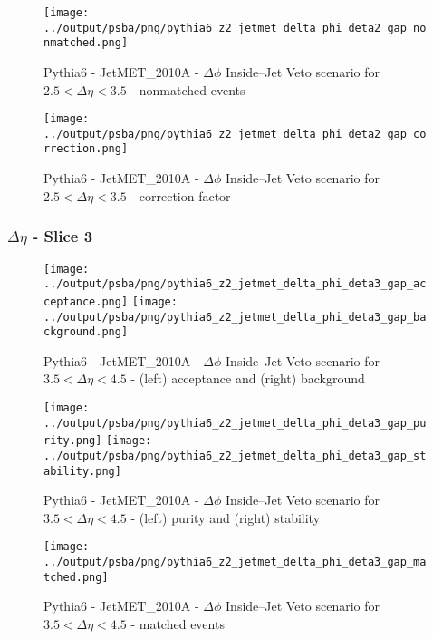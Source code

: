 \documentclass[11pt]{book}
\begin{document}
\begin{figure}[ht]
\centering
\texttt{[image: ../output/psba/png/pythia6\_z2\_jetmet\_delta\_phi\_deta2\_gap\_nonmatched.png]}
\caption{Pythia6 - JetMET\_2010A - $\Delta\phi$ Inside--Jet Veto scenario for $2.5 < \Delta\eta < 3.5$ - nonmatched events}
\label{fig:p6_jetmet_delta_phi_deta2_gap_nonmatched}
\end{figure}

\begin{figure}[ht]
\centering
\texttt{[image: ../output/psba/png/pythia6\_z2\_jetmet\_delta\_phi\_deta2\_gap\_correction.png]}
\caption{Pythia6 - JetMET\_2010A - $\Delta\phi$ Inside--Jet Veto scenario for $2.5 < \Delta\eta < 3.5$ - correction factor}
\label{fig:p6_jetmet_delta_phi_deta2_gap_correction}
\end{figure}


\clearpage
\subsubsection{$\Delta\eta$ - Slice 3}
\begin{figure}[ht]
\centering
\texttt{[image: ../output/psba/png/pythia6\_z2\_jetmet\_delta\_phi\_deta3\_gap\_acceptance.png]}
\texttt{[image: ../output/psba/png/pythia6\_z2\_jetmet\_delta\_phi\_deta3\_gap\_background.png]}
\caption{Pythia6 - JetMET\_2010A - $\Delta\phi$ Inside--Jet Veto scenario for $3.5 < \Delta\eta < 4.5$ - (left) acceptance and (right) background}
\label{fig:p6_jetmet_delta_phi_deta3_gap_ab}
\end{figure}

\begin{figure}[ht]
\centering
\texttt{[image: ../output/psba/png/pythia6\_z2\_jetmet\_delta\_phi\_deta3\_gap\_purity.png]}
\texttt{[image: ../output/psba/png/pythia6\_z2\_jetmet\_delta\_phi\_deta3\_gap\_stability.png]}
\caption{Pythia6 - JetMET\_2010A - $\Delta\phi$ Inside--Jet Veto scenario for $3.5 < \Delta\eta < 4.5$ - (left) purity and (right) stability}
\label{fig:p6_jetmet_delta_phi_deta3_gap_ps}
\end{figure}

\begin{figure}[ht]
\centering
\texttt{[image: ../output/psba/png/pythia6\_z2\_jetmet\_delta\_phi\_deta3\_gap\_matched.png]}
\caption{Pythia6 - JetMET\_2010A - $\Delta\phi$ Inside--Jet Veto scenario for $3.5 < \Delta\eta < 4.5$ - matched events}
\label{fig:p6_jetmet_delta_phi_deta3_gap_matched}
\end{figure}
\end{document}
